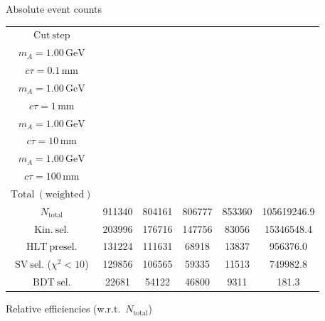 \documentclass[10pt,a4paper]{article}
\renewcommand{\arraystretch}{1.4}
\begin{document}
{\footnotesize\setlength{\tabcolsep}{4pt}\renewcommand{\arraystretch}{1.05}%
\vspace{12pt}

Absolute event counts

\begin{tabular}{cccccc}
\toprule
$\mathrm{Cut\ step}$ & \shortstack{$m_{\pi}=10\,\mathrm{GeV}$\\$m_{A}=1.00\,\mathrm{GeV}$\\$c\tau=0.1\,\mathrm{mm}$} & \shortstack{$m_{\pi}=10\,\mathrm{GeV}$\\$m_{A}=1.00\,\mathrm{GeV}$\\$c\tau=1\,\mathrm{mm}$} & \shortstack{$m_{\pi}=10\,\mathrm{GeV}$\\$m_{A}=1.00\,\mathrm{GeV}$\\$c\tau=10\,\mathrm{mm}$} & \shortstack{$m_{\pi}=10\,\mathrm{GeV}$\\$m_{A}=1.00\,\mathrm{GeV}$\\$c\tau=100\,\mathrm{mm}$} & \shortstack{$\mathrm{QCD}$\\$\mathrm{Total\ (weighted)}$} \\
\midrule
$N_{\mathrm{total}}$ & 911340 & 804161 & 806777 & 853360 & 105619246.9\\
$\mathrm{Kin.\ sel.}$ & 203996 & 176716 & 147756 & 83056 & 15346548.4\\
$\mathrm{HLT\ presel.}$ & 131224 & 111631 & 68918 & 13837 & 956376.0\\
$\mathrm{SV\ sel.}$ ($\chi^2{<}10$) & 129856 & 106565 & 59335 & 11513 & 749982.8\\
$\mathrm{BDT\ sel.}$ & 22681 & 54122 & 46800 & 9311 & 181.3\\
\bottomrule
\end{tabular}

\vspace{18pt}

Relative efficiencies (w.r.t.\ $N_{\mathrm{total}}$)

}
\end{document}
